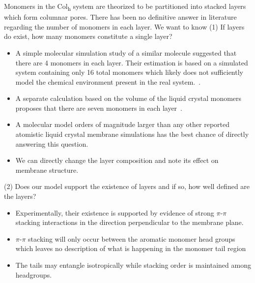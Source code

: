 \documentclass{article}
\begin{document}
  Monomers in the Col\textsubscript{h} system are theorized to be partitioned
  into stacked layers which form columnar pores. There has been no definitive
  answer in literature regarding the number of monomers in each layer. We want to
  know (1) If layers do exist, how many monomers constitute a single layer?
  \begin{itemize}
    \item A simple molecular simulation study of a similar molecule suggested
    that there are 4 monomers in each layer. Their estimation is based on a
    simulated system containing only 16 total monomers which likely does not sufficiently
    model the chemical environment present in the real system.~\cite{zhu_methacrylated_2006}. 
    \item A separate calculation based on the volume of the liquid crystal monomers proposes
    that there are seven monomers in each layer~\cite{resel_structural_2000}. 
    \item A molecular model orders of magnitude larger than any other reported atomistic 
    liquid crystal membrane simulations has the best chance of directly answering this question.
    \item We can directly change the layer composition and note its effect on membrane structure.
  \end{itemize}

  (2) Does our model support the existence of layers and if so, how well defined
  are the layers?
  \begin{itemize}
       \item Experimentally, their existence is supported by evidence of strong 
       $\pi$-$\pi$ stacking interactions in the direction perpendicular to the
       membrane plane.
       \item $\pi$-$\pi$ stacking will only occur between the aromatic monomer head groups which
       leaves no description of what is happening in the monomer tail region
       \item The tails may entangle isotropically while stacking order is maintained
       among headgroups. 
  \end{itemize}  
  
\end{document}

